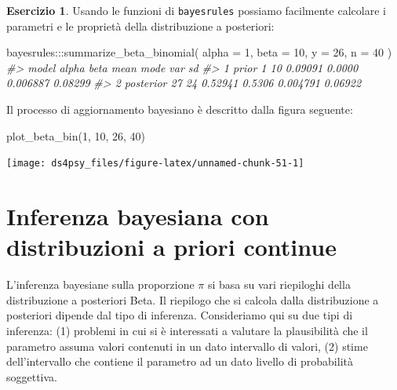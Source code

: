 \documentclass[
  11pt,
]{krantz}
\makeatletter
\newenvironment{Shaded}{\begin{snugshade}}{\end{snugshade}}
\newcommand{\AttributeTok}[1]{\textcolor[rgb]{0.61,0.61,0.61}{#1}}
\newcommand{\CommentTok}[1]{\textcolor[rgb]{0.37,0.37,0.37}{\textit{#1}}}
\newcommand{\DecValTok}[1]{\textcolor[rgb]{0.06,0.06,0.06}{#1}}
\newcommand{\FunctionTok}[1]{\textcolor[rgb]{0,0,0}{#1}}
\newcommand{\NormalTok}[1]{#1}
\newcommand{\SpecialCharTok}[1]{\textcolor[rgb]{0,0,0}{#1}}
\newenvironment{kframe}{%
\medskip{}
\setlength{\fboxsep}{.8em}
 \def\at@end@of@kframe{}%
 \ifinner\ifhmode%
  \def\at@end@of@kframe{\end{minipage}}%
  \begin{minipage}{\columnwidth}%
 \fi\fi%
 \def\FrameCommand##1{\hskip\@totalleftmargin \hskip-\fboxsep
 \colorbox{shadecolor}{##1}\hskip-\fboxsep
     \hskip-\linewidth \hskip-\@totalleftmargin \hskip\columnwidth}%
 \MakeFramed {\advance\hsize-\width
   \@totalleftmargin\z@ \linewidth\hsize
   \@setminipage}}%
 {\par\unskip\endMakeFramed%
 \at@end@of@kframe}
\renewenvironment{Shaded}{\begin{kframe}}{\end{kframe}}
\theoremstyle{definition}
\theoremstyle{definition}
\theoremstyle{definition}
\newtheorem{exercise}{Esercizio}[chapter]
\theoremstyle{definition}
\theoremstyle{remark}
\makeatother
\begin{document}
\begin{exercise}
Usando le funzioni di \texttt{bayesrules} possiamo facilmente calcolare i parametri e le proprietà della distribuzione a posteriori:

\begin{Shaded}
\begin{Highlighting}[]
\NormalTok{bayesrules}\SpecialCharTok{:::}\FunctionTok{summarize\_beta\_binomial}\NormalTok{(}
  \AttributeTok{alpha =} \DecValTok{1}\NormalTok{, }\AttributeTok{beta =} \DecValTok{10}\NormalTok{, }\AttributeTok{y =} \DecValTok{26}\NormalTok{, }\AttributeTok{n =} \DecValTok{40}
\NormalTok{)}
\CommentTok{\#\textgreater{}       model alpha beta    mean   mode      var      sd}
\CommentTok{\#\textgreater{} 1     prior     1   10 0.09091 0.0000 0.006887 0.08299}
\CommentTok{\#\textgreater{} 2 posterior    27   24 0.52941 0.5306 0.004791 0.06922}
\end{Highlighting}
\end{Shaded}

Il processo di aggiornamento bayesiano è descritto dalla figura seguente:

\begin{Shaded}
\begin{Highlighting}[]
\FunctionTok{plot\_beta\_bin}\NormalTok{(}\DecValTok{1}\NormalTok{, }\DecValTok{10}\NormalTok{, }\DecValTok{26}\NormalTok{, }\DecValTok{40}\NormalTok{)}
\end{Highlighting}
\end{Shaded}

\begin{center}\texttt{[image: ds4psy\_files/figure-latex/unnamed-chunk-51-1]} \end{center}

\end{exercise}

\hypertarget{inferenza-bayesiana-con-distribuzioni-a-priori-continue}{%
\section{Inferenza bayesiana con distribuzioni a priori continue}\label{inferenza-bayesiana-con-distribuzioni-a-priori-continue}}

L'inferenza bayesiane sulla proporzione \(\pi\) si basa su vari riepiloghi della distribuzione a posteriori Beta. Il riepilogo che si calcola dalla distribuzione a posteriori dipende dal tipo di inferenza. Consideriamo qui su due tipi di inferenza: (1) problemi in cui si è interessati a valutare la plausibilità che il parametro assuma valori contenuti in un dato intervallo di valori, (2) stime dell'intervallo che contiene il parametro ad un dato livello di probabilità soggettiva.
\end{document}
